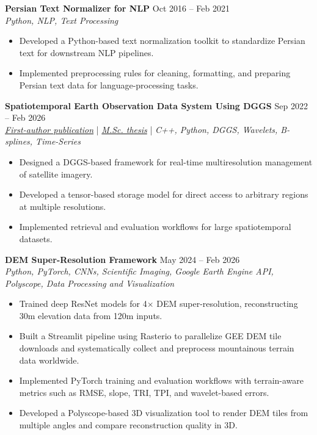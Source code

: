 \documentclass[a4paper,10pt]{article}
\begin{document}
\noindent
\textbf{Persian Text Normalizer for NLP} \hfill Oct 2016 -- Feb 2021 \\
\textit{Python, NLP, Text Processing}
\begin{itemize}[leftmargin=0.25in]
    \item Developed a Python-based text normalization toolkit to standardize Persian text for downstream NLP pipelines.
    \item Implemented preprocessing rules for cleaning, formatting, and preparing Persian text data for language-processing tasks.
\end{itemize}

\noindent
\textbf{Spatiotemporal Earth Observation Data System Using DGGS} \hfill Sep 2022 -- Feb 2026 \\
\textit{\href{https://doi.org/10.3390/rs17040570}{First-author publication}} | \textit{\href{https://ucalgary.scholaris.ca/items/114b394b-e516-4732-bd3a-45dd6160d480}{M.Sc. thesis}} | \textit{C++, Python, DGGS, Wavelets, B-splines, Time-Series}
\begin{itemize}[leftmargin=0.25in]
    \item Designed a DGGS-based framework for real-time multiresolution management of satellite imagery.
    \item Developed a tensor-based storage model for direct access to arbitrary regions at multiple resolutions.
    \item Implemented retrieval and evaluation workflows for large spatiotemporal datasets.
\end{itemize}

\noindent
\textbf{DEM Super-Resolution Framework} \hfill May 2024 -- Feb 2026 \\
\textit{Python, PyTorch, CNNs, Scientific Imaging, Google Earth Engine API, Polyscope, Data Processing and Visualization}
\begin{itemize}[leftmargin=0.25in]
    \item Trained deep ResNet models for 4$\times$ DEM super-resolution, reconstructing 30m elevation data from 120m inputs.
    \item Built a Streamlit pipeline using Rasterio to parallelize GEE DEM tile downloads and systematically collect and preprocess mountainous terrain data worldwide.
    \item Implemented PyTorch training and evaluation workflows with terrain-aware metrics such as RMSE, slope, TRI, TPI, and wavelet-based errors.
    \item Developed a Polyscope-based 3D visualization tool to render DEM tiles from multiple angles and compare reconstruction quality in 3D.
\end{itemize}
\end{document}
